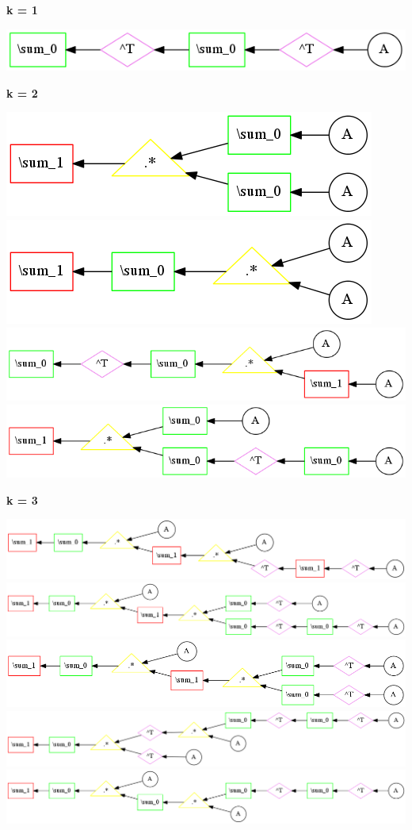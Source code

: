 {\bf k = 1}


\begin{center}
\includegraphics[width=0.45\linewidth]{trees/RBM_1_horizontal_0.png}
\end{center}


{\bf k = 2}


\begin{center}
\includegraphics[width=0.45\linewidth]{trees/RBM_2_horizontal_0.png}
\includegraphics[width=0.45\linewidth]{trees/RBM_2_horizontal_1.png}
\includegraphics[width=0.45\linewidth]{trees/RBM_2_horizontal_2.png}
\includegraphics[width=0.45\linewidth]{trees/RBM_2_horizontal_3.png}
\end{center}


{\bf k = 3}


\begin{center}
\includegraphics[width=0.45\linewidth]{trees/RBM_3_horizontal_0.png}
\includegraphics[width=0.45\linewidth]{trees/RBM_3_horizontal_1.png}
\includegraphics[width=0.45\linewidth]{trees/RBM_3_horizontal_2.png}
\includegraphics[width=0.45\linewidth]{trees/RBM_3_horizontal_3.png}
\includegraphics[width=0.45\linewidth]{trees/RBM_3_horizontal_4.png}
\end{center}


